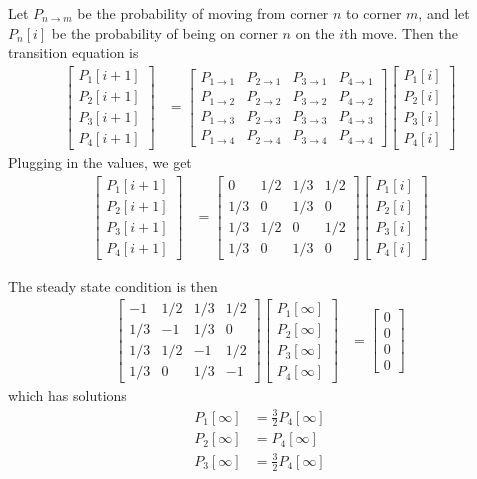 \documentclass[twocolumn]{myarticle}
\newcommand{\mat}[1]{\begin{bmatrix}#1\end{bmatrix}}
\begin{document}
Let $ P_{n \to m} $ be the probability of moving from corner $ n $ to corner $ m $, and let $ P_n[i] $ be the probability of being on corner $ n $ on the $ i $th move.
Then the transition equation is
\begin{align}
    \mat{P_1[i+1] \\ P_2[i+1] \\ P_3[i+1] \\ P_4[i+1]} &= 
    \mat{P_{1 \to 1} & P_{2 \to 1} & P_{3 \to 1} & P_{4 \to 1} \\
         P_{1 \to 2} & P_{2 \to 2} & P_{3 \to 2} & P_{4 \to 2} \\
         P_{1 \to 3} & P_{2 \to 3} & P_{3 \to 3} & P_{4 \to 3} \\
         P_{1 \to 4} & P_{2 \to 4} & P_{3 \to 4} & P_{4 \to 4} }
    \mat{P_1[i] \\ P_2[i] \\ P_3[i] \\ P_4[i]} 
\end{align}
Plugging in the values, we get
\begin{align}
    \mat{P_1[i+1] \\ P_2[i+1] \\ P_3[i+1] \\ P_4[i+1]} &= 
    \mat{0 & 1/2 & 1/3 & 1/2 \\
         1/3 & 0 & 1/3 & 0 \\
         1/3 & 1/2 & 0 & 1/2 \\
         1/3 & 0 & 1/3 & 0 }
    \mat{P_1[i] \\ P_2[i] \\ P_3[i] \\ P_4[i]} 
\end{align}

The steady state condition is then
\begin{align}
    \mat{-1 & 1/2 & 1/3 & 1/2 \\
         1/3 & -1 & 1/3 & 0 \\
         1/3 & 1/2 & -1 & 1/2 \\
        1/3 & 0 & 1/3 & -1 }
    \mat{P_1[\infty] \\ P_2[\infty] \\ P_3[\infty] \\ P_4[\infty]} &= \mat{0 \\ 0 \\ 0 \\ 0 }
\end{align}
which has solutions
\begin{align}
    P_1[\infty] &= \frac{3}{2} P_4[\infty]
    \\
    P_2[\infty] &= P_4[\infty]
    \\
    P_3[\infty] &= \frac{3}{2} P_4[\infty]
\end{align}
\end{document}
